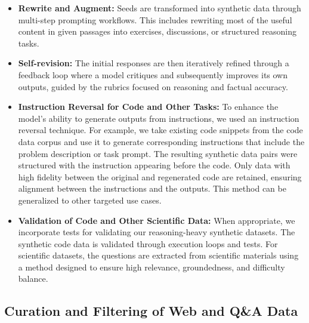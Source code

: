 \begin{itemize}
\begin{enumerate}
\end{enumerate}
    \item \textbf{Rewrite and Augment:} Seeds are transformed into synthetic data through multi-step prompting workflows. This includes rewriting most of the useful content in given passages into exercises, discussions, or structured reasoning tasks. 
    \item \textbf{Self-revision:} The initial responses are then iteratively refined through a feedback loop where a model critiques and subsequently improves its own outputs, guided by the rubrics focused on reasoning and factual accuracy.
    \item \textbf{Instruction Reversal for Code and Other Tasks:} To enhance the model’s ability to generate outputs from instructions, we used an instruction reversal technique. For example, we take existing code snippets from the code data corpus and use it to generate corresponding instructions that include the problem description or task prompt. The resulting synthetic data pairs were structured with the instruction appearing before the code. Only data with high fidelity between the original and regenerated code are retained, ensuring alignment between the instructions and the outputs. This method can be generalized to other targeted use cases. 
    \item \textbf{Validation of Code and Other Scientific Data:} When appropriate, we incorporate tests for validating our reasoning-heavy synthetic datasets. The synthetic code data is validated through execution loops and tests. For scientific datasets, the questions are extracted from scientific materials using a method designed to ensure high relevance, groundedness, and difficulty balance. 
\end{itemize}

\subsection{Curation and Filtering of Web and Q\&A Data}
